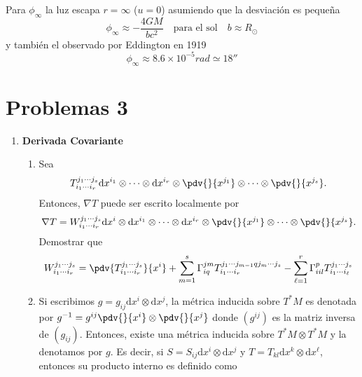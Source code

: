 \documentclass[../main]{subfiles}
\begin{document}
\begin{adjustwidth}{0pt}{-100pt}
Para $\phi_{\infty}$ la luz escapa $r=\infty$ ($u=0$) asumiendo que la desviación es pequeña 
\begin{equation}
    \phi_{\infty}\approx -\dfrac{4GM}{bc^2} \quad \text{para el sol} \quad b\approx R_{\odot}
\end{equation}
y también el observado por Eddington en 1919
\begin{equation}
    \phi_{\infty}\approx 8.6\times 10^{-5}rad \simeq 18''
\end{equation}

\section*{Problemas 3}

\begin{enumerate}
    \item \textbf{Derivada Covariante}
    \begin{enumerate}[label=(\alph*)]
        \item Sea 
        \begin{equation}
            T^{j_1 \cdots j_s}_{i_1 \cdots i_r}\mathrm{d}x^{i_1} \otimes \cdots \otimes \mathrm{d}x^{i_r}\otimes \pdv{}{x^{j_1}} \otimes \cdots \otimes \pdv{}{x^{j_s}}. 
        \end{equation}
        Entonces, $\nabla T$ puede ser escrito localmente por 
        \begin{equation}
            \nabla T=W^{j_1 \cdots j_s}_{i_1 \cdots i_r} \mathrm{d}x^{i} \otimes \mathrm{d}x^{i_1} \otimes \cdots \otimes \mathrm{d}x^{i_r} \otimes \pdv{}{x^{j_1}} \otimes \cdots \otimes \pdv{}{x^{j_s}}.
        \end{equation}
        Demostrar que 
        \begin{equation}
            W^{j_1 \cdots j_s}_{i_1 \cdots i_r}=\pdv{T^{j_1 \cdots j_s}_{i_1 \cdots i_r}}{x^{i}}+\sum_{m=1}^s \Gamma^{jm}_{iq} T^{j_1 \cdots j_{m-1}qj_m \cdots j_s}_{i_1 \cdots i_r}-\sum_{\ell=1}^r \Gamma^{p}_{iil}T^{j_1 \cdots j_s}_{i_1 \cdots i_{\ell}}
        \end{equation}
        \item Si escribimos $g=g_{ij}\mathrm{d}x^{i}\otimes \mathrm{d}x^{j}$, la métrica inducida sobre $T^* M$ es denotada por $g^{-1}=g^{ij}\pdv{}{x^{i}}\otimes \pdv{}{x^{j}}$ donde $(g^{ij})$ es la matriz inversa de $(g_{ij})$. Entonces, existe una métrica inducida sobre $T^* M\otimes T^* M$ y la denotamos por $g$. Es decir, si $S=S_{ij}\mathrm{d}x^{i}\otimes \mathrm{d}x^{j}$ y $T=T_{kl}\mathrm{d}x^k \otimes \mathrm{d}x^{\ell}$, entonces su producto interno es definido como 

\end{enumerate}
\end{enumerate}
\end{adjustwidth}
\end{document}
